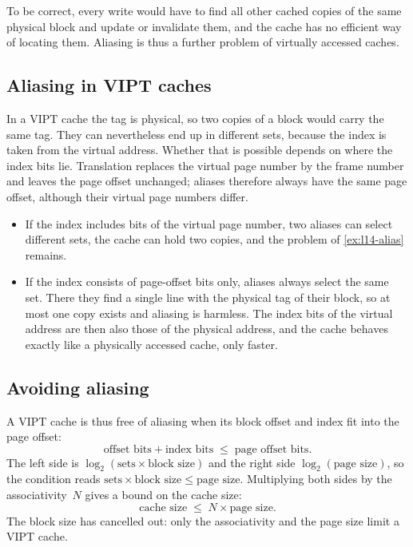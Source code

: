 \documentclass[../main.tex]{subfiles}
\begin{document}
To be correct, every write would have to find all other cached copies of the
same physical block and update or invalidate them, and the cache has no
efficient way of locating them.  Aliasing is thus a further problem of
virtually accessed caches.

\subsection{Aliasing in VIPT caches}

In a VIPT cache the tag is physical, so two copies of a block would carry the
same tag.  They can nevertheless end up in different sets, because the index
is taken from the virtual address.  Whether that is possible depends on where
the index bits lie.  Translation replaces the virtual page number by the frame
number and leaves the page offset unchanged; aliases therefore always have the
same page offset, although their virtual page numbers differ.
\begin{itemize}
  \item If the index includes bits of the virtual page number, two aliases can
    select different sets, the cache can hold two copies, and the problem of
    \cref{ex:l14-alias} remains.
  \item If the index consists of page-offset bits only, aliases always select
    the same set.  There they find a single line with the physical tag of
    their block, so at most one copy exists and aliasing is harmless.  The
    index bits of the virtual address are then also those of the physical
    address, and the cache behaves exactly like a physically accessed cache,
    only faster.
\end{itemize}

\subsection{Avoiding aliasing}

A VIPT cache is thus free of aliasing when its block offset and index fit
into the page offset:
\begin{equation}
  \text{offset bits} + \text{index bits} \;\le\; \text{page offset bits} .
  \label{eq:l14-vipt-bits}
\end{equation}
The left side is $\log_2(\text{sets} \times \text{block size})$ and the right
side $\log_2(\text{page size})$, so the condition reads
$\text{sets} \times \text{block size} \le \text{page size}$.  Multiplying both
sides by the associativity~$N$ gives a bound on the cache size:
\begin{equation}
  \text{cache size} \;\le\; N \times \text{page size} .
  \label{eq:l14-vipt-size}
\end{equation}
The block size has cancelled out: only the associativity and the page size
limit a VIPT cache.
\end{document}
